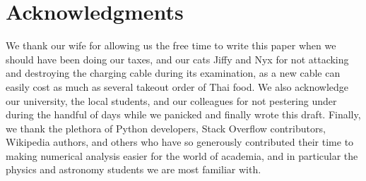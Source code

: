 \documentclass{JINST}
\begin{document}
\section*{Acknowledgments}
We thank our wife for allowing us the free time to write this paper when we should have been doing our taxes, and our cats Jiffy and Nyx for not attacking and destroying the charging cable during its examination, as a new cable can easily cost as much as several takeout order of Thai food. We also acknowledge our university, the local students, and our colleagues for not pestering under during the handful of days while we panicked and finally wrote this draft. Finally, we thank the plethora of Python developers, Stack Overflow contributors, Wikipedia authors, and others who have so generously contributed their time to making numerical analysis easier for the world of academia, and in particular the physics and astronomy students we are most familiar with. 

\newpage


\end{document}

